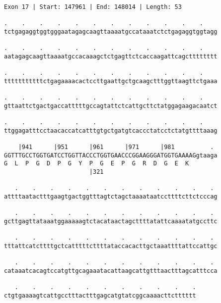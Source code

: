 \documentclass{article}
\begin{document}
\newpage
\begin{Verbatim}
Exon 17 | Start: 147961 | End: 148014 | Length: 53
 
.    .    .    .    .    .    .    .    .    .    .    .    
tctgagaggtggtgggaatagagcaagttaaaatgccataaatctctgagaggtggtagg
  
.    .    .    .    .    .    .    .    .    .    .    .    
aatagagcaagttaaaatgccacaaagctctgagttctcaccaagattcagctttttttt
  
.    .    .    .    .    .    .    .    .    .    .    .    
tttttttttttctgagaaaacactccttgaattgctgcaagctttggttaagttctgaaa
  
.    .    .    .    .    .    .    .    .    .    .    .    
gttaattctgactgaccatttttgccagtattctcattgcttctatggagaagacaatct
  
.    .    .    .    .    .    .    .    .    .    .    .    
ttggagatttcctaacaccatcatttgtgctgatgtcaccctatcctctatgttttaaag
  
    |941      |951      |961      |971      |981          . 
GGTTTGCCTGGTGATCCTGGTTACCCTGGTGAACCCGGAAGGGATGGTGAAAAGgtaaga
G  L  P  G  D  P  G  Y  P  G  E  P  G  R  D  G  E  K        
                        |321                                
  
   .    .    .    .    .    .    .    .    .    .    .    . 
attttaatactttgaagtgactggtttagtctagctaaaataatccttttcttctcccag
  
   .    .    .    .    .    .    .    .    .    .    .    . 
gcttgagttataaatggaaaaagtctacataactagcttttatattcaaaatatgccttc
  
   .    .    .    .    .    .    .    .    .    .    .    . 
tttattcatcttttgctcatttttcttttataccacacttgctaaattttattccattgc
  
   .    .    .    .    .    .    .    .    .    .    .    . 
cataaatcacagtccatgttgcagaaatacattaagcattgtttaactttagcatttcca
  
   .    .    .    .    .    .    .    .    .    .    .
ctgtgaaaagtcattgcctttactttgagcatgtatcggcaaaacttctttttt
\end{Verbatim}
\newpage
\end{document}
